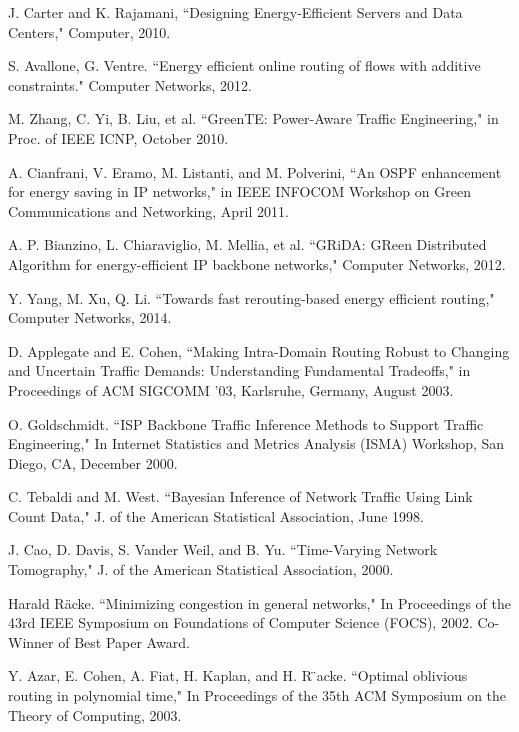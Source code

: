 \documentclass[conference]{IEEEtran}
\begin{document}
\begin{thebibliography}{1}

J. Carter and K. Rajamani, ``Designing Energy-Efficient Servers and Data Centers," Computer, 2010.

S. Avallone, G. Ventre. ``Energy efficient online routing of flows with additive constraints." Computer Networks, 2012.

M. Zhang, C. Yi, B. Liu, et al. ``GreenTE: Power-Aware Traffic Engineering," in Proc. of IEEE ICNP, October 2010.

A. Cianfrani, V. Eramo, M. Listanti, and M. Polverini, ``An OSPF enhancement for energy saving in IP networks," in IEEE INFOCOM Workshop on Green Communications and Networking, April 2011.

A. P. Bianzino, L. Chiaraviglio, M. Mellia, et al. ``GRiDA: GReen Distributed Algorithm for energy-efficient IP backbone networks," Computer Networks, 2012.

Y. Yang, M. Xu, Q. Li. ``Towards fast rerouting-based energy efficient routing," Computer Networks, 2014.

D. Applegate and E. Cohen, ``Making Intra-Domain Routing Robust to Changing and Uncertain Traffic Demands: Understanding Fundamental Tradeoffs," in Proceedings of ACM SIGCOMM ’03, Karlsruhe, Germany, August 2003.

O. Goldschmidt. ``ISP Backbone Traffic Inference Methods to Support Traffic Engineering," In Internet Statistics and Metrics Analysis (ISMA) Workshop, San Diego, CA, December 2000.

C. Tebaldi and M. West. ``Bayesian Inference of Network Traffic Using Link Count Data," J. of the American Statistical Association, June 1998.

J. Cao, D. Davis, S. Vander Weil, and B. Yu. ``Time-Varying Network Tomography," J. of the American Statistical Association, 2000.

Harald R\"{a}cke. ``Minimizing congestion in general networks," In Proceedings of the 43rd IEEE Symposium on Foundations of Computer Science (FOCS), 2002. Co-Winner of Best Paper Award.

Y. Azar, E. Cohen, A. Fiat, H. Kaplan, and H. R ̈acke. ``Optimal oblivious routing in polynomial time," In Proceedings of the 35th ACM Symposium on the Theory of Computing, 2003.


\end{thebibliography}
\end{document}
